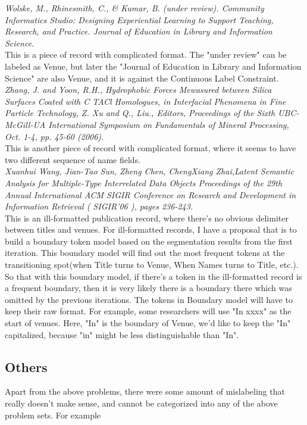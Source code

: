 \documentclass[11pt]{article}
\begin{document}
\textit{Wolske, M., Rhinesmith, C., \& Kumar, B. (under review). Community Informatics Studio: Designing Experiential Learning to Support Teaching, Research, and Practice. Journal of Education in Library and Information Science. }\\

This is a piece of record with complicated format. The "under review" can be labeled as Venue, but later the "Journal of Education in Library and Information Science" are also Venue, and it is against the Continuous Label Constraint. \\

\textit{Zhang, J. and Yoon, R.H., Hydrophobic Forces Mewasured between Silica Surfaces Coated with C TACl Homologues, in Interfacial Phenomena in Fine Particle Technology, Z. Xu and Q., Liu., Editors, Proceedings of the Sixth UBC-McGill-UA International Symposium on Fundamentals of Mineral Processing, Oct. 1-4, pp. 45-60 (2006).}\\

This is another piece of record with complicated format, where it seems to have two different sequence of name fields. \\

\textit{Xuanhui Wang, Jian-Tao Sun, Zheng Chen, ChengXiang Zhai,Latent Semantic Analysis for Multiple-Type Interrelated Data Objects  Proceedings of the 29th Annual International ACM SIGIR Conference on Research and Development in Information Retrieval ( SIGIR'06 ), pages 236-243.}\\

This is an ill-formatted publication record, where there's no obvious delimiter between titles and venues. For ill-formatted records, I have a proposal that is to build a boundary token model based on the segmentation results from the first iteration. This boundary model will find out the most frequent tokens at the transitioning spot(when Title turns to Venue, When Names turns to Title, etc.). So that with this boundary model, if there's a token in the ill-formatted record is a frequent boundary, then it is very likely there is a boundary there which was omitted by the previous iterations. The tokens in Boundary model will have to keep their raw format. For example, some researchers will use "In xxxx" as the start of venues. Here, "In" is the boundary of Venue, we'd like to keep the "In" capitalized, because "in" might be less distinguishable than "In". 

\subsection{Others}
Apart from the above problems, there were some amount of mislabeling that really doesn't make sense, and cannot be categorized into any of the above problem sets. For example\\
\end{document}
